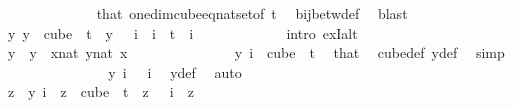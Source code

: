 \begin{isabellebody}
\ \ \ \ \ \ \ \ \ \ \ \ \isamarkupfalse%
\ that\ one{\isacharunderscore}{\kern0pt}dim{\isacharunderscore}{\kern0pt}cube{\isacharunderscore}{\kern0pt}eq{\isacharunderscore}{\kern0pt}nat{\isacharunderscore}{\kern0pt}set{\isacharbrackleft}{\kern0pt}of\ {\isachardoublequoteopen}t{\isachardoublequoteclose}{\isacharbrackright}{\kern0pt}\ \isamarkupfalse%
\ bij{\isacharunderscore}{\kern0pt}betw{\isacharunderscore}{\kern0pt}def\ \isamarkupfalse%
\ blast\isanewline
\ \ \ \ \ \ \ \ \ \ \isamarkupfalse%
\ \isamarkupfalse%
\ {\isachardoublequoteopen}{\isasymexists}{\isacharbang}{\kern0pt}y{\isachardot}{\kern0pt}\ y\ {\isasymin}\ cube\ {}\ t\ {\isasymand}\ y\ {}\ {\isacharequal}{\kern0pt}\ i{\isachardoublequoteclose}\ \ {\isachardoublequoteopen}i\ {\isacharless}{\kern0pt}\ t{\isachardoublequoteclose}\ \ i\ \isanewline
\ \ \ \ \ \ \ \ \ \ \isamarkupfalse%
\ {\isacharparenleft}{\kern0pt}intro\ ex{}I{\isacharunderscore}{\kern0pt}alt{\isacharparenright}{\kern0pt}\isanewline
\ \ \ \ \ \ \ \ \ \ \ \ \isamarkupfalse%
\ y\ \ {\isachardoublequoteopen}y\ {\isasymequiv}\ {\isacharparenleft}{\kern0pt}{\isasymlambda}x{\isacharcolon}{\kern0pt}{\isacharcolon}{\kern0pt}nat{\isachardot}{\kern0pt}\ {\isasymlambda}y{\isasymin}{\isacharbraceleft}{\kern0pt}{\isachardot}{\kern0pt}{\isachardot}{\kern0pt}{\isacharless}{\kern0pt}{}{\isacharcolon}{\kern0pt}{\isacharcolon}{\kern0pt}nat{\isacharbraceright}{\kern0pt}{\isachardot}{\kern0pt}\ x{\isacharparenright}{\kern0pt}{\isachardoublequoteclose}\ \isanewline
\ \ \ \ \ \ \ \ \ \ \ \ \isamarkupfalse%
\ {\isachardoublequoteopen}y\ i\ {\isasymin}\ {\isacharparenleft}{\kern0pt}cube\ {}\ t{\isacharparenright}{\kern0pt}{\isachardoublequoteclose}\ \isamarkupfalse%
\ that\ \isamarkupfalse%
\ cube{\isacharunderscore}{\kern0pt}def\ y{\isacharunderscore}{\kern0pt}def\ \isamarkupfalse%
\ simp\isanewline
\ \ \ \ \ \ \ \ \ \ \ \ \isamarkupfalse%
\ \isamarkupfalse%
\ {\isachardoublequoteopen}y\ i\ {}\ {\isacharequal}{\kern0pt}\ i{\isachardoublequoteclose}\ \isamarkupfalse%
\ y{\isacharunderscore}{\kern0pt}def\ \isamarkupfalse%
\ auto\isanewline
\ \ \ \ \ \ \ \ \ \ \ \ \isamarkupfalse%
\ \isamarkupfalse%
\ {\isachardoublequoteopen}z\ {\isacharequal}{\kern0pt}\ y\ i{\isachardoublequoteclose}\ \ {\isachardoublequoteopen}z\ {\isasymin}\ cube\ {}\ t{\isachardoublequoteclose}\ \ {\isachardoublequoteopen}z\ {}\ {\isacharequal}{\kern0pt}\ i{\isachardoublequoteclose}\ \ z\isanewline

\end{isabellebody}

